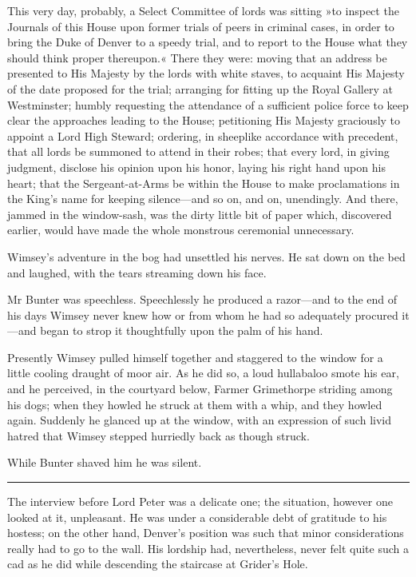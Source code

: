 This very day, probably, a Select Committee of lords was sitting »to inspect the Journals of this House upon former trials of peers in criminal cases, in order to bring the Duke of Denver to a speedy trial, and to report to the House what they should think proper thereupon.« There they were: moving that an address be presented to His Majesty by the lords with white staves, to acquaint His Majesty of the date proposed for the trial; arranging for fitting up the Royal Gallery at Westminster; humbly requesting the attendance of a sufficient police force to keep clear the approaches leading to the House; petitioning His Majesty graciously to appoint a Lord High Steward; ordering, in sheeplike accordance with precedent, that all lords be summoned to attend in their robes; that every lord, in giving judgment, disclose his opinion upon his honor, laying his right hand upon his heart; that the Sergeant-at-Arms be within the House to make proclamations in the King's name for keeping silence\allowbreak---\allowbreak and so on, and on, unendingly.  And there, jammed in the window-sash, was the dirty little bit of paper which, discovered earlier, would have made the whole monstrous ceremonial unnecessary.

Wimsey's adventure in the bog had unsettled his nerves. He sat down on the bed and laughed, with the tears streaming down his face.

Mr Bunter was speechless. Speechlessly he produced a razor\allowbreak---\allowbreak and to the end of his days Wimsey never knew how or from whom he had so adequately procured it\allowbreak---\allowbreak and began to strop it thoughtfully upon the palm of his hand.

Presently Wimsey pulled himself together and staggered to the window for a little cooling draught of moor air. As he did so, a loud hullabaloo smote his ear, and he perceived, in the courtyard below, Farmer Grimethorpe striding among his dogs; when they howled he struck at them with a whip, and they howled again. Suddenly he glanced up at the window, with an expression of such livid hatred that Wimsey stepped hurriedly back as though struck.

While Bunter shaved him he was silent. 

\noindent\hfil\rule{0.5\textwidth}{.4pt}\hfil 

The interview before Lord Peter was a delicate one; the situation, however one looked at it, unpleasant. He was under a considerable debt of gratitude to his hostess; on the other hand, Denver's position was such that minor considerations really had to go to the wall. His lordship had, nevertheless, never felt quite such a cad as he did while descending the staircase at Grider's Hole.

